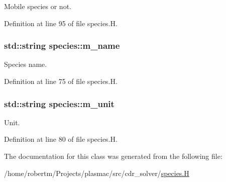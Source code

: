 Mobile species or not. 



Definition at line 95 of file species.\+H.

\subsubsection[{\texorpdfstring{m\+\_\+name}{m_name}}]{\setlength{\rightskip}{0pt plus 5cm}std\+::string species\+::m\+\_\+name\hspace{0.3cm}{\ttfamily [protected]}}\hypertarget{classspecies_aa1f69b1d67009b1a6751864fbc6b836a}{}\label{classspecies_aa1f69b1d67009b1a6751864fbc6b836a}


Species name. 



Definition at line 75 of file species.\+H.

\subsubsection[{\texorpdfstring{m\+\_\+unit}{m_unit}}]{\setlength{\rightskip}{0pt plus 5cm}std\+::string species\+::m\+\_\+unit\hspace{0.3cm}{\ttfamily [protected]}}\hypertarget{classspecies_a93a6215695c7707db4eb72f5b29e3a0b}{}\label{classspecies_a93a6215695c7707db4eb72f5b29e3a0b}


Unit. 



Definition at line 80 of file species.\+H.



The documentation for this class was generated from the following file\+:\begin{DoxyCompactItemize}
\item 
/home/robertm/\+Projects/plasmac/src/cdr\+\_\+solver/\hyperlink{species_8H}{species.\+H}\end{DoxyCompactItemize}
